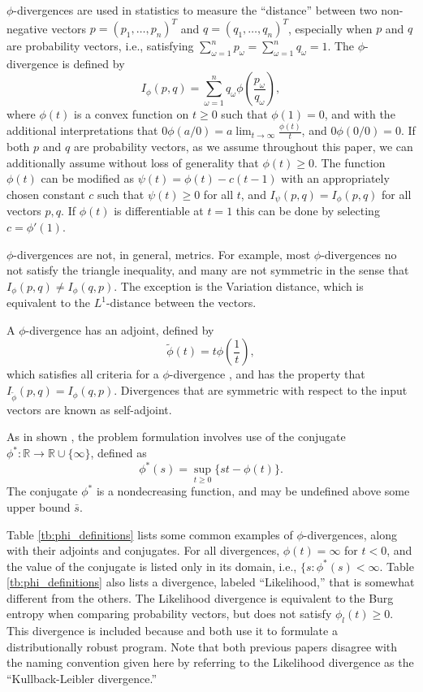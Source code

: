 \documentclass[ijoc,nonblindrev]{informs3} %
\newcommand{\R}{{\mathbb{R}}}
\begin{document}
$\phi$-divergences are used in statistics to measure the ``distance'' between two non-negative vectors $p = (p_1, \dots, p_n)^T$ and $q = (q_1, \dots, q_n)^T$, especially when $p$ and $q$ are probability vectors, i.e., satisfying $\sum_{\omega=1}^n p_\omega = \sum_{\omega=1}^n q_\omega = 1$.
The $\phi$-divergence is defined by
\[
	I_\phi(p,q) = \sum_{\omega=1}^n q_\omega \phi\left(\frac{p_\omega}{q_\omega}\right),
\]
where $\phi(t)$ is a convex function on $t \geq 0$ such that $\phi(1) = 0$, and with the additional interpretations that $0 \phi(a/0) = a \lim_{t \rightarrow \infty} \frac{\phi(t)}{t}$, and $0 \phi(0/0) = 0$.
If both $p$ and $q$ are probability vectors, as we assume throughout this paper, we can additionally assume without loss of generality that $\phi(t) \geq 0$.
The function $\phi(t)$ can be modified as $\psi(t) = \phi(t) - c(t-1)$ with an appropriately chosen constant $c$ such that $\psi(t) \geq 0$ for all $t$, and $I_\psi(p,q) = I_\phi(p,q)$ for all vectors $p,q$.
If $\phi(t)$ is differentiable at $t = 1$ this can be done by selecting $c = \phi'(1)$.

$\phi$-divergences are not, in general, metrics.
For example, most $\phi$-divergences no not satisfy the triangle inequality, and many are not symmetric in the sense that $I_\phi(p,q) \neq I_\phi(q,p)$.
The exception is the Variation distance, which is equivalent to the $L^1$-distance between the vectors.

A $\phi$-divergence has an adjoint, defined by
\begin{equation} \label{eq:adjoint}
	\tilde{\phi}(t) = t \phi\left(\frac{1}{t}\right),
\end{equation}
which satisfies all criteria for a $\phi$-divergence \cite{bental1991certainty}, and has the property that $I_{\tilde{\phi}}(p,q) = I_\phi(q,p)$.
Divergences that are symmetric with respect to the input vectors are known as self-adjoint.

As in shown \cite{bental2011robust}, the problem formulation involves use of the conjugate $\phi^* : \R \rightarrow \R \cup \{\infty\}$, defined as
\begin{equation} \label{eq:conjugate}
	\phi^*(s) = \sup_{t \geq 0} \{st - \phi(t)\}.
\end{equation}
The conjugate $\phi^*$ is a nondecreasing function, and may be undefined above some upper bound $\bar{s}$.

Table \ref{tb:phi_definitions} lists some common examples of $\phi$-divergences, along with their adjoints and conjugates.
For all divergences, $\phi(t) = \infty$ for $t < 0$, and the value of the conjugate is listed only in its domain, i.e., $\{s : \phi^*(s) < \infty$.
Table \ref{tb:phi_definitions} also lists a divergence, labeled ``Likelihood,'' that is somewhat different from the others.
The Likelihood divergence is equivalent to the Burg entropy when comparing probability vectors, but does not satisfy $\phi_l(t) \geq 0$.
This divergence is included because \cite{hukullback} and \cite{wang2010likelihood} both use it to formulate a distributionally robust program.
Note that both previous papers disagree with the naming convention given here by referring to the Likelihood divergence as the ``Kullback-Leibler divergence.''
\end{document}
